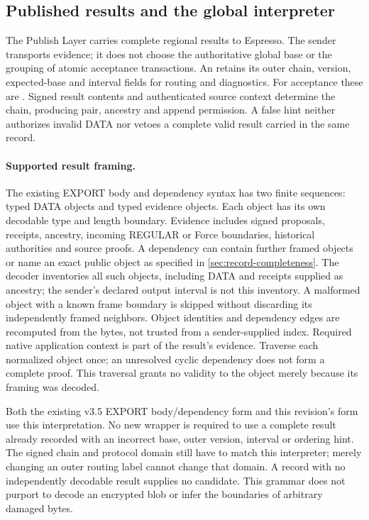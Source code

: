 \subsection{Published results and the global interpreter}
\label{sec:exports}
The Publish Layer carries complete regional results to Espresso.
The sender transports evidence; it does not choose the authoritative
global base or the grouping of atomic acceptance transactions.
An  retains its outer chain, version, expected-base and
interval fields for routing and diagnostics. For acceptance these are
. Signed result contents and authenticated source context
determine the chain, producing pair, ancestry and append permission.
A false hint neither authorizes invalid DATA nor vetoes a complete
valid result carried in the same record.

\paragraph{Supported result framing.}
The existing EXPORT body and dependency syntax has two finite sequences:
typed DATA objects and typed evidence objects. Each object has its own
decodable type and length boundary. Evidence includes signed proposals,
receipts, ancestry, incoming REGULAR or Force boundaries, historical
authorities and source proofs. A dependency can contain further framed
objects or name an exact public object as specified in
\cref{sec:record-completeness}. The decoder inventories all such objects,
including DATA and receipts supplied as ancestry; the sender's declared
output interval is not this inventory. A malformed object with a known
frame boundary is skipped without discarding its independently framed
neighbors. Object identities and dependency edges are recomputed from
the bytes, not trusted from a sender-supplied index.
Required native application context is part of the result's evidence.
Traverse each normalized object once; an unresolved cyclic dependency
does not form a complete proof. This traversal grants no validity to
the object merely because its framing was decoded.

Both the existing v3.5 EXPORT body/dependency form and this revision's
form use this interpretation. No new wrapper is required to use a
complete result already recorded with an incorrect base, outer version,
interval or ordering hint. The signed chain and protocol domain still
have to match this interpreter; merely changing an outer routing label
cannot change that domain. A record with no independently decodable
result supplies no candidate. This grammar does not purport to decode
an encrypted blob or infer the boundaries of arbitrary damaged bytes.

